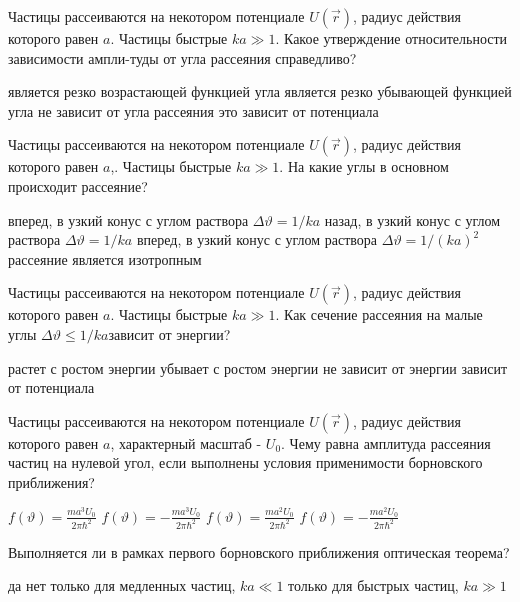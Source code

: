 \documentclass[11pt,a4paper]{exam}
\begin{document}
\begin{questions}
\question Частицы рассеиваются на некотором потенциале $U(\vec r)$, радиус действия которого равен $a$. Частицы быстрые $ka \gg 1$. Какое утверждение относительности зависимости ампли-туды от угла рассеяния справедливо?
\begin{choices}
\choice является резко возрастающей функцией угла
\choice является резко убывающей функцией угла
\choice не зависит от угла рассеяния
\choice это зависит от потенциала
\end{choices}

\question Частицы рассеиваются на некотором потенциале $U(\vec r)$, радиус действия которого равен $a$,. Частицы быстрые $ka \gg 1$. На какие углы в основном происходит рассеяние?
\begin{choices}
\choice вперед, в узкий конус с углом раствора $\Delta \vartheta  = 1/ka$
\choice назад, в узкий конус с углом раствора $\Delta \vartheta  = 1/ka$
\choice вперед, в узкий конус с углом раствора $\Delta \vartheta  = 1/{(ka)^2}$ 
\choice рассеяние является изотропным
\end{choices}

\question Частицы рассеиваются на некотором потенциале $U(\vec r)$, радиус действия которого равен $a$. Частицы быстрые $ka \gg 1$. Как сечение рассеяния на малые углы $\Delta \vartheta  \le 1/ka$зависит от энергии?
\begin{choices}
\choice растет с ростом энергии
\choice убывает с ростом энергии
\choice не зависит от энергии
\choice зависит от потенциала
\end{choices}

\question Частицы рассеиваются на некотором потенциале $U(\vec r)$, радиус действия которого равен $a$, характерный масштаб - ${U_0}$. Чему равна амплитуда рассеяния частиц на нулевой угол, если выполнены условия применимости борновского приближения?
\begin{choices}
\choice $f(\vartheta ) = \frac{{m{a^3}{U_0}}}{{2\pi {\hbar ^2}}}$      
\choice $f(\vartheta ) =  - \frac{{m{a^3}{U_0}}}{{2\pi {\hbar ^2}}}$
\choice $f(\vartheta ) = \frac{{m{a^2}{U_0}}}{{2\pi {\hbar ^2}}}$      
\choice $f(\vartheta ) =  - \frac{{m{a^2}{U_0}}}{{2\pi {\hbar ^2}}}$
\end{choices}

\question Выполняется ли в рамках первого борновского приближения оптическая теорема? 
\begin{choices}
\choice да
\choice нет
\choice только для медленных частиц, $ka \ll 1$
\choice только для быстрых частиц, $ka \gg 1$ 
\end{choices}


\end{questions}
\end{document}
